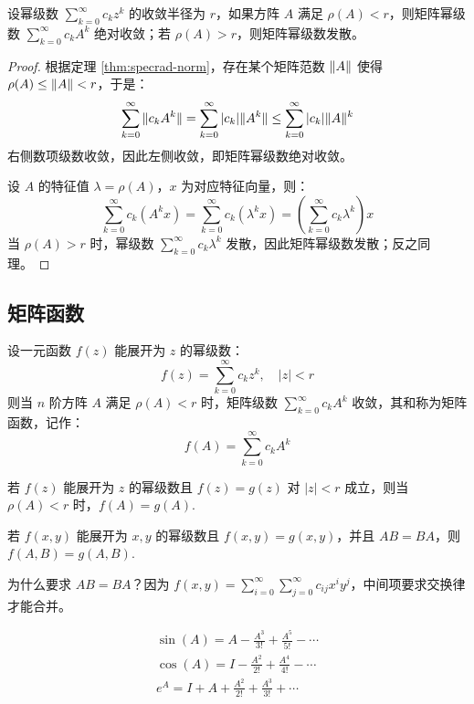 \begin{theorem}
设幂级数 $\sum_{k=0}^\infty c_kz^k$ 的收敛半径为 $r$，如果方阵 $A$ 满足 $\rho(A)<r$，则矩阵幂级数 $\sum_{k=0}^\infty c_kA^k$ 绝对收敛；若 $\rho(A)>r$，则矩阵幂级数发散。
\end{theorem}
\begin{proof}
根据定理 \ref{thm:specrad-norm}，存在某个矩阵范数 $\Vert A\Vert$ 使得 $\rho(A)\leq\Vert A\Vert<r$，于是：
\[
    \sum_{k=0}^{\infty}\Vert c_kA^k\Vert=\sum_{k=0}^{\infty}|c_k|\Vert A^k\Vert\leq\sum_{k=0}^\infty |c_k|\Vert A\Vert^k
\]
右侧数项级数收敛，因此左侧收敛，即矩阵幂级数绝对收敛。

设 $A$ 的特征值 $\lambda=\rho(A)$，$x$ 为对应特征向量，则：
\[
    \sum_{k=0}^\infty c_k(A^kx)=\sum_{k=0}^\infty c_k(\lambda^k x)=\left(\sum_{k=0}^\infty c_k\lambda^k\right)x
\]
当 $\rho(A)>r$ 时，幂级数 $\sum_{k=0}^\infty c_k\lambda^k$ 发散，因此矩阵幂级数发散；反之同理。
\end{proof}


\subsection{矩阵函数}
\label{sec:3-matrix-function}

\begin{definition}[矩阵函数]
设一元函数 $f(z)$ 能展开为 $z$ 的幂级数：
\[
    f(z)=\sum_{k=0}^\infty c_kz^k,\quad |z|<r
\]
则当 $n$ 阶方阵 $A$ 满足 $\rho(A)<r$ 时，矩阵级数 $\sum_{k=0}^\infty c_kA^k$ 收敛，其和称为矩阵函数，记作：
\[
    f(A)=\sum_{k=0}^\infty c_k A^k
\]
\end{definition}

\begin{theorem}[代入规则]
若 $f(z)$ 能展开为 $z$ 的幂级数且 $f(z)=g(z)$ 对 $|z|<r$ 成立，则当 $\rho(A)<r$ 时，$f(A)=g(A)$.
\end{theorem}

\begin{theorem}[二元函数的代入规则]
若 $f(x,y)$ 能展开为 $x,y$ 的幂级数且 $f(x,y)=g(x,y)$，并且 $AB=BA$，则 $f(A,B)=g(A,B)$.
\end{theorem}

\begin{remark}
为什么要求 $AB=BA$？因为 $f(x,y)=\sum_{i=0}^\infty\sum_{j=0}^\infty c_{ij}x^iy^j$，中间项要求交换律才能合并。
\end{remark}

\begin{example}
\begin{gather*}
    \sin(A)=A-\frac{A^3}{3!}+\frac{A^5}{5!}-\cdots\\
    \cos(A)=I-\frac{A^2}{2!}+\frac{A^4}{4!}-\cdots\\
    e^A=I+A+\frac{A^2}{2!}+\frac{A^3}{3!}+\cdots
\end{gather*}
\end{example}

